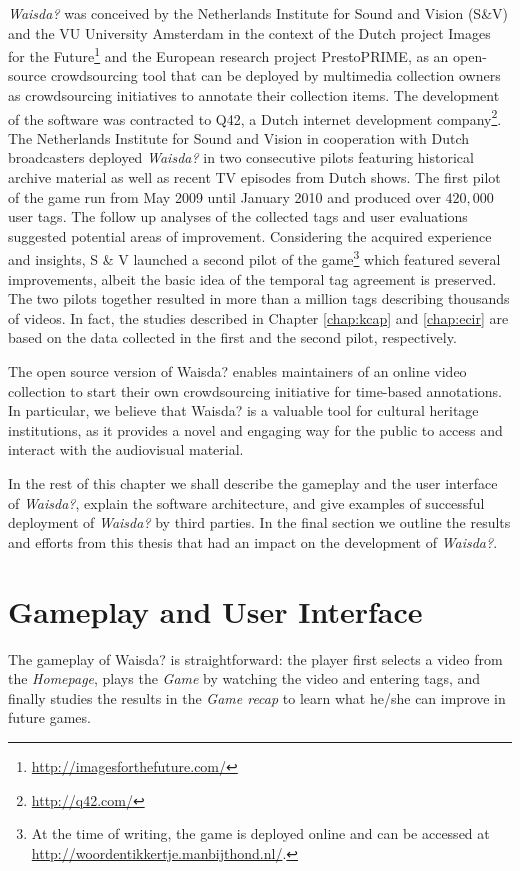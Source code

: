 \textit{Waisda?} was conceived by the Netherlands Institute for Sound and Vision (S\&V) and the VU University Amsterdam in the context of the Dutch project Images for the Future\footnote{\url{http://imagesforthefuture.com/}} and the European research project PrestoPRIME, as an open-source crowdsourcing tool that can be deployed by multimedia collection owners as crowdsourcing initiatives to annotate their collection items. The development of the software was contracted to Q42, a Dutch internet development company\footnote{\url{http://q42.com/}}. The Netherlands Institute for Sound and Vision in cooperation with Dutch broadcasters deployed \textit{Waisda?} in two consecutive pilots featuring historical archive material as well as recent TV episodes from Dutch shows. The first pilot of the game run from May 2009 until January 2010 and produced over $420,000$ user tags. The follow up analyses of the collected tags \cite{Annelies,ecir} and user evaluations suggested potential areas of improvement. Considering the acquired experience and insights, S \& V launched a second pilot of the game\footnote{At the time of writing, the game is deployed online and can be accessed at \url{http://woordentikkertje.manbijthond.nl/}.} which featured several improvements, albeit the basic idea of the temporal tag agreement is preserved. The two pilots together resulted in more than a million tags describing thousands of videos. In fact, the studies described in Chapter \ref{chap:kcap} and \ref{chap:ecir} are based on the data collected in the first and the second pilot, respectively.

The open source version of Waisda? enables maintainers of an online video collection to start their own crowdsourcing initiative for time-based annotations. In particular, we believe that Waisda? is a valuable tool for cultural heritage institutions, as it provides a novel and engaging way for the public to access and interact with the audiovisual material.

In the rest of this chapter we shall describe the gameplay and the user interface of \textit{Waisda?}, explain the software architecture, and give examples of successful deployment of \textit{Waisda?} by third parties. In the final section we outline the results and efforts from this thesis that had an impact on the development of \textit{Waisda?}.

\section{Gameplay and User Interface}
The gameplay of Waisda? is straightforward: the player first selects a video from the \textit{Homepage}, plays the \textit{Game} by watching the video and entering tags, and finally studies the results in the \textit{Game recap} to learn what he/she can improve in future games.

